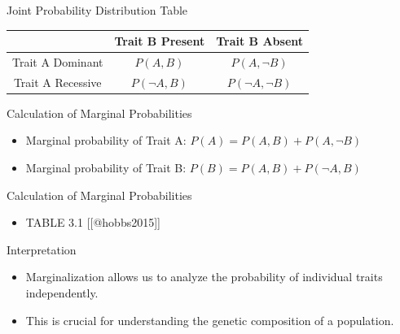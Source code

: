 \documentclass{beamer}
\begin{document}
\begin{frame}{Joint Probability Distribution Table}
  \begin{center}
    \begin{tabular}{|c|c|c|}
      \hline
      & Trait B Present & Trait B Absent \\
      \hline
      Trait A Dominant & $P(A, B)$ & $P(A, \neg B)$ \\
      \hline
      Trait A Recessive & $P(\neg A, B)$ & $P(\neg A, \neg B)$ \\
      \hline
    \end{tabular}
  \end{center}
\end{frame}

\begin{frame}{Calculation of Marginal Probabilities}
  \begin{itemize}
    \item Marginal probability of Trait A: $P(A) = P(A, B) + P(A, \neg B)$
    \item Marginal probability of Trait B: $P(B) = P(A, B) + P(\neg A, B)$
  \end{itemize}
\end{frame}

\begin{frame}{Calculation of Marginal Probabilities}
  \begin{itemize}
    \item TABLE 3.1 [[@hobbs2015]]
  \end{itemize}
\end{frame}

\begin{frame}{Interpretation}
  \begin{itemize}
    \item Marginalization allows us to analyze the probability of individual traits independently.
    \item This is crucial for understanding the genetic composition of a population.
  \end{itemize}
\end{frame}
\end{document}
